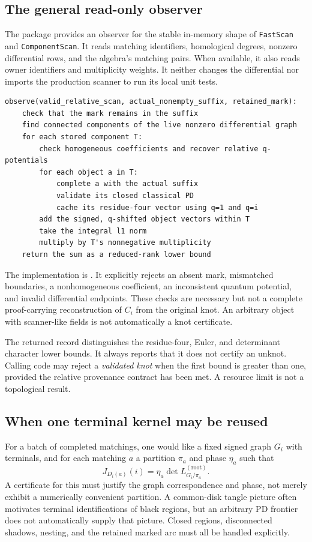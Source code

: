 \documentclass[11pt]{article}
\theoremstyle{definition}
\theoremstyle{remark}
\newcommand{\code}[1]{\texttt{#1}}
\begin{document}
\subsection{The general read-only observer}
The package provides an observer for the stable in-memory shape of
\code{FastScan} and \code{ComponentScan}. It reads matching identifiers,
homological degrees, nonzero differential rows, and the algebra's matching
pairs. When available, it also reads owner identifiers and multiplicity
weights. It neither changes the differential nor imports the production
scanner to run its local unit tests.

\begin{lstlisting}
observe(valid_relative_scan, actual_nonempty_suffix, retained_mark):
    check that the mark remains in the suffix
    find connected components of the live nonzero differential graph
    for each stored component T:
        check homogeneous coefficients and recover relative q-potentials
        for each object a in T:
            complete a with the actual suffix
            validate its closed classical PD
            cache its residue-four vector using q=1 and q=i
        add the signed, q-shifted object vectors within T
        take the integral l1 norm
        multiply by T's nonnegative multiplicity
    return the sum as a reduced-rank lower bound
\end{lstlisting}

The implementation is . It explicitly rejects
an absent mark, mismatched boundaries, a nonhomogeneous coefficient, an
inconsistent quantum potential, and invalid differential endpoints. These
checks are necessary but not a complete proof-carrying reconstruction of
$C_i$ from the original knot. An arbitrary object with scanner-like fields
is not automatically a knot certificate.

The returned record distinguishes the residue-four, Euler, and determinant
character lower bounds. It always reports that it does not certify an
unknot. Calling code may reject a \emph{validated knot} when the first bound
is greater than one, provided the relative provenance contract has been
met. A resource limit is not a topological result.

\subsection{When one terminal kernel may be reused}
For a batch of completed matchings, one would like a fixed signed graph
$G_i$ with terminals, and for each matching $a$ a partition $\pi_a$ and phase
$\eta_a$ such that
\begin{equation}\label{eq:geometrycontract}
 J_{D_i(a)}(i)=\eta_a\det L_{G_i/\pi_a}^{(\mathrm{root})}.
\end{equation}
A certificate for this must justify the graph correspondence and phase,
not merely exhibit a numerically convenient partition. A common-disk tangle
picture often motivates terminal identifications of black regions, but an
arbitrary PD frontier does not automatically supply that picture. Closed
regions, disconnected shadows, nesting, and the retained marked arc must
all be handled explicitly.
\end{document}
